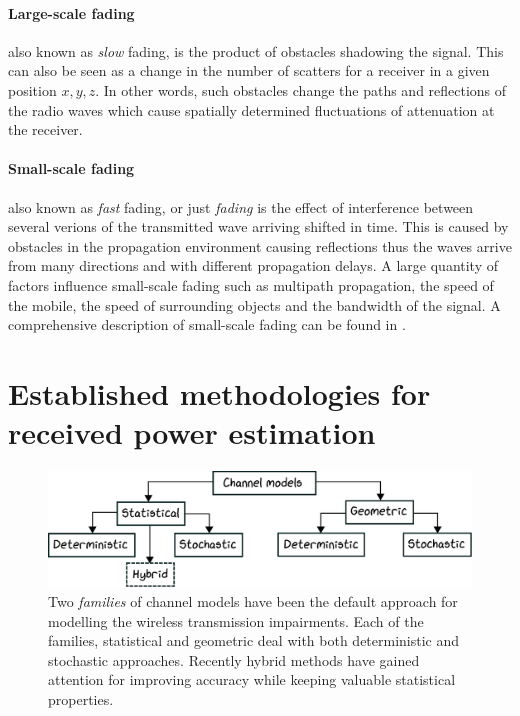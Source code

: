 \paragraph{Large-scale fading}
also known as \emph{slow} fading, is the product of obstacles shadowing the signal. This can also be seen as a change in the number of scatters for a receiver in a given position $x,y,z$. In other words, such obstacles change the paths and reflections of the radio waves which cause spatially determined fluctuations of attenuation at the receiver. 


\paragraph{Small-scale fading}\label{sec:small_scale_fading}
also known as \emph{fast} fading, or just \emph{fading} \cite{Rappaport:2001:WCP:559977} is the effect of interference between several verions of the transmitted wave arriving shifted in time. This is caused by obstacles in the propagation environment causing reflections thus the waves arrive from many directions and with different propagation delays. A large quantity of factors influence small-scale fading such as multipath propagation, the speed of the mobile, the speed of surrounding objects and the bandwidth of the signal. A comprehensive description of small-scale fading can be found in \cite{Rappaport:2001:WCP:559977}. 



\section{Established methodologies for received power estimation}



\begin{figure}
    \centering
    \includegraphics[width=\textwidth]{chapters/part_pathloss/figures/channelmodel_tree.eps}
    \caption{Two \emph{families} of channel models have been the default approach for modelling the wireless transmission impairments. Each of the families, statistical and geometric deal with both deterministic and stochastic approaches. Recently hybrid methods have gained attention for improving accuracy while keeping valuable statistical properties.}
    \label{fig:channel_models}
\end{figure}


